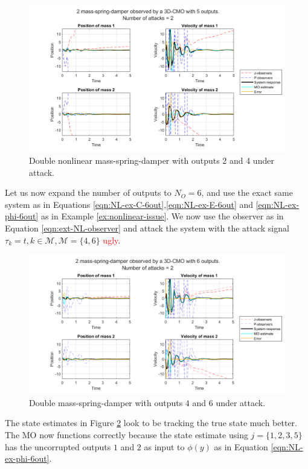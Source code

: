 \begin{example}
\begin{figure}[H]
        \centering
        \includegraphics[width=\linewidth]{report/Figures/extended_nonlinear_not_functional.png}
        \caption{Double nonlinear mass-spring-damper with outputs 2 and 4 under attack.}
        \label{fig:extended_nonlinear_not_functional}
    \end{figure}
    Let us now expand the number of outputs to $N_O=6$, and use the exact same system as in Equations \eqref{eqn:NL-ex-C-6out},\eqref{eqn:NL-ex-E-6out} and \eqref{eqn:NL-ex-phi-6out} as in Example \ref{ex:nonlinear-issue}. We now use the observer as in Equation \eqref{eqn:ext-NL-observer} and attack the system with the attack signal $\tau_k=t,k \in \mathcal{M},\mathcal{M}=\{4,6\}$ \textcolor{red}{ugly}.
    \begin{figure}[H]
        \centering
        \includegraphics[width=\linewidth]{report/Figures/extended-nonlinear-functional.png}
        \caption{Double mass-spring-damper with outputs $4$ and $6$ under attack.}
        \label{fig:extended-nonlinear-functional}
    \end{figure}
    The state estimates in Figure \ref{fig:extended-nonlinear-functional} look to be tracking the true state much better. The MO now functions correctly because the state estimate using $j=\{1,2,3,5\}$ has the uncorrupted outputs $1$ and $2$ as input to $\phi(y)$ as in Equation \eqref{eqn:NL-ex-phi-6out}.
\end{example}
